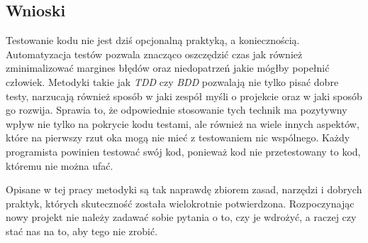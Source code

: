   \subsection{Wnioski}
  
  Testowanie kodu nie jest dziś opcjonalną praktyką, a koniecznością. Automatyzacja testów pozwala znacząco oszczędzić czas jak również zminimalizować margines błędów oraz niedopatrzeń jakie mógłby popełnić człowiek. Metodyki takie jak \emph{TDD} czy \emph{BDD} pozwalają nie tylko pisać dobre testy, narzucają również sposób w jaki zespół myśli o projekcie oraz w jaki sposób go rozwija. Sprawia to, że odpowiednie stosowanie tych technik ma pozytywny wpływ nie tylko na pokrycie kodu testami, ale również na wiele innych aspektów, które na pierwszy rzut oka mogą nie mieć z testowaniem nic wspólnego. Każdy programista powinien testować swój kod, ponieważ kod nie przetestowany to kod, któremu nie można ufać. 
  
  Opisane w tej pracy metodyki są tak naprawdę zbiorem zasad, narzędzi i dobrych praktyk, których skuteczność została wielokrotnie potwierdzona. Rozpoczynając nowy projekt nie należy zadawać sobie pytania o to, czy je wdrożyć, a raczej czy stać nas na to, aby tego nie zrobić.
  